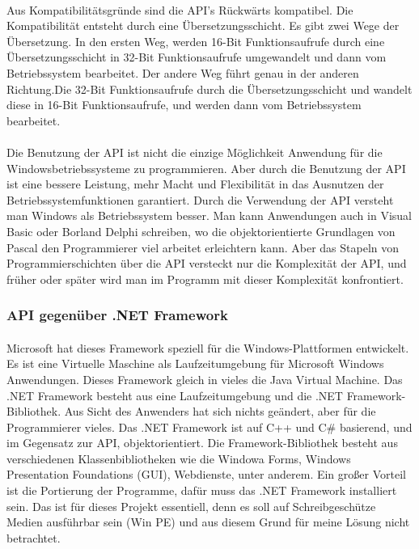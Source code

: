 \paragraph{}
 Aus Kompatibilitätsgründe sind die API's Rückwärts kompatibel. Die Kompatibilität entsteht durch eine Übersetzungsschicht. Es gibt zwei Wege der Übersetzung. In den ersten Weg, werden 16-Bit Funktionsaufrufe durch eine Übersetzungsschicht in 32-Bit Funktionsaufrufe umgewandelt und dann vom Betriebssystem bearbeitet. Der andere Weg führt genau in der anderen Richtung.Die 32-Bit Funktionsaufrufe durch die Übersetzungsschicht und wandelt diese in 16-Bit Funktionsaufrufe, und werden dann vom Betriebssystem bearbeitet.
\paragraph{}
Die Benutzung der API ist nicht die einzige Möglichkeit Anwendung für die Windowsbetriebssysteme zu programmieren. Aber durch die Benutzung der API ist eine bessere Leistung, mehr Macht und Flexibilität in das Ausnutzen der Betriebssystemfunktionen garantiert. Durch die Verwendung der API versteht man Windows als Betriebssystem besser. Man kann Anwendungen auch in Visual Basic oder Borland Delphi schreiben, wo die objektorientierte Grundlagen von Pascal den Programmierer viel arbeitet erleichtern kann. Aber das Stapeln von Programmierschichten über die API versteckt nur die Komplexität der API, und früher oder später wird man im Programm mit dieser Komplexität konfrontiert.


\subsubsection{API gegenüber .NET Framework}
\paragraph{}
Microsoft hat dieses Framework speziell für die Windows-Plattformen entwickelt. Es ist eine Virtuelle Maschine als Laufzeitumgebung für Microsoft Windows Anwendungen. Dieses Framework gleich in vieles die Java Virtual Machine. Das .NET Framework besteht aus eine Laufzeitumgebung und die .NET Framework-Bibliothek. Aus Sicht des Anwenders hat sich nichts geändert, aber für die Programmierer vieles. Das .NET Framework ist auf C++ und C\# basierend, und im Gegensatz zur API, objektorientiert. Die Framework-Bibliothek besteht aus verschiedenen Klassenbibliotheken wie die Windowa Forms, Windows Presentation Foundations (GUI), Webdienste, unter anderem. Ein großer Vorteil ist die Portierung der Programme, dafür muss das .NET Framework installiert sein. Das ist für dieses Projekt essentiell, denn es soll auf Schreibgeschütze Medien ausführbar sein (Win PE) und aus diesem Grund für meine Lösung nicht betrachtet.




